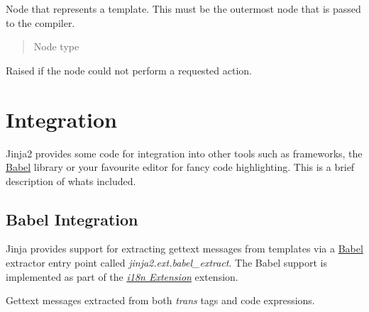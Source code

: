 \documentclass[a4paper,10pt,english]{sphinxmanual}
\begin{document}

\begin{fulllineitems}
\label{extensions:jinja2.nodes.Template}
Node that represents a template.  This must be the outermost node that
is passed to the compiler.
\begin{quote}\begin{description}
\item[{Node type}] \leavevmode
{\hyperref[extensions:jinja2.nodes.Node]{}}

\end{description}\end{quote}

\end{fulllineitems}


\begin{fulllineitems}
\label{extensions:jinja2.nodes.Impossible}
Raised if the node could not perform a requested action.

\end{fulllineitems}



\chapter{Integration}
\label{integration::doc}\label{integration:integration}
Jinja2 provides some code for integration into other tools such as frameworks,
the \href{http://babel.edgewall.org/}{Babel} library or your favourite editor for fancy code highlighting.
This is a brief description of whats included.


\section{Babel Integration}
\label{integration:babel-integration}\label{integration:id1}
Jinja provides support for extracting gettext messages from templates via a
\href{http://babel.edgewall.org/}{Babel} extractor entry point called \emph{jinja2.ext.babel\_extract}.  The Babel
support is implemented as part of the {\hyperref[extensions:i18n-extension]{\emph{i18n Extension}}} extension.

Gettext messages extracted from both \emph{trans} tags and code expressions.
\end{document}
